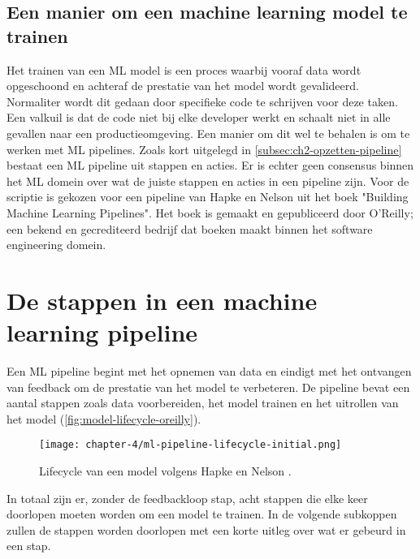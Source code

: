 \subsection{Een manier om een machine learning model te trainen}\label{subsec:ch4-een-manier-om-een-machine-learning-model-te-trainen}
Het trainen van een ML model is een proces waarbij vooraf data wordt opgeschoond en achteraf de prestatie van het model wordt gevalideerd. Normaliter wordt dit gedaan door specifieke code te schrijven voor deze taken. Een valkuil is dat de code niet bij elke developer werkt en schaalt niet in alle gevallen naar een productieomgeving. Een manier om dit wel te behalen is om te werken met ML pipelines. Zoals kort uitgelegd in \autoref{subsec:ch2-opzetten-pipeline} bestaat een ML pipeline uit stappen en acties. Er is echter geen consensus binnen het ML domein over wat de juiste stappen en acties in een pipeline zijn. Voor de scriptie is gekozen voor een pipeline van Hapke en Nelson uit het boek "Building Machine Learning Pipelines". Het boek is gemaakt en gepubliceerd door O'Reilly; een bekend en gecrediteerd bedrijf dat boeken maakt binnen het software engineering domein.

\section{De stappen in een machine learning pipeline}\label{sec:ch4-de-stappen-in-een-machine-learning-pipeline}
Een ML pipeline begint met het opnemen van data en eindigt met het ontvangen van feedback om de prestatie van het model te verbeteren. De pipeline bevat een aantal stappen zoals data voorbereiden, het model trainen en het uitrollen van het model (\autoref{fig:model-lifecycle-oreilly}).

\begin{figure}[hbt!]
  \centering
  \texttt{[image: chapter-4/ml-pipeline-lifecycle-initial.png]}
  \caption{Lifecycle van een model volgens Hapke en Nelson \cite[p.~4]{building-machine-learning-pipelines-oreilly}.}
  \label{fig:model-lifecycle-oreilly}
\end{figure}

In totaal zijn er, zonder de feedbackloop stap, acht stappen die elke keer doorlopen moeten worden om een model te trainen. In de volgende subkoppen zullen de stappen worden doorlopen met een korte uitleg over wat er gebeurd in een stap. 

